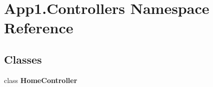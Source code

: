 \hypertarget{namespace_app1_1_1_controllers}{}\section{App1.\+Controllers Namespace Reference}
\label{namespace_app1_1_1_controllers}
\subsection*{Classes}
\begin{DoxyCompactItemize}
\item 
class {\bfseries Home\+Controller}
\end{DoxyCompactItemize}
